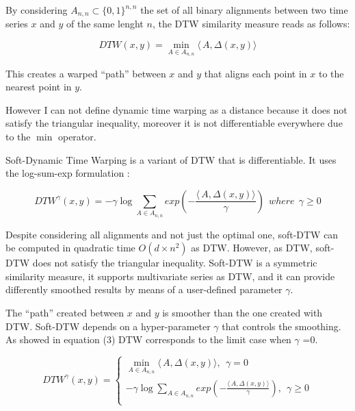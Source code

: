 \documentclass[11pt]{article}
\begin{document}
By considering \(A_{n,n} \subset \{0, 1\}^{n,n}\) the set of all binary
alignments between two time series \(x\) and \(y\) of the same lenght
\(n\), the DTW similarity measure reads as follows:

\begin{equation}
\label{eq:1}
DTW(x,y)= \min_{A \in A_{n,n} } \langle\,A,\Delta(x,y) \rangle
\end{equation}

This creates a warped ``path'' between \(x\) and \(y\) that aligns each
point in \(x\) to the nearest point in \(y\).

However I can not define dynamic time warping as a distance because it
does not satisfy the triangular inequality, moreover it is not
differentiable everywhere due to the \(\min\) operator.

Soft-Dynamic Time Warping is a variant of DTW that is differentiable. It
uses the log-sum-exp formulation \cite{cuturi2017soft}:

\begin{equation}
\label{eq:2}
DTW^{\gamma}(x,y)= - \gamma \log \sum_{A \in A_{n,n}} exp(- \frac{\langle\,A,\Delta(x,y) \rangle}{\gamma})
  \ \ where \ \ \gamma  \geq 0
\end{equation}

Despite considering all alignments and not just the optimal one,
soft-DTW can be computed in quadratic time \(O(d \times n^2)\) as DTW.
However, as DTW, soft-DTW does not satisfy the triangular inequality.
Soft-DTW is a symmetric similarity measure, it supports multivariate
series as DTW, and it can provide differently smoothed results by means
of a user-defined parameter \(\gamma\).

    The ``path'' created between \(x\) and \(y\) is smoother than the one
created with DTW. Soft-DTW depends on a hyper-parameter \(\gamma\) that
controls the smoothing. As showed in equation (3) DTW corresponds to the
limit case when \(\gamma\) =0.

\begin{equation}
\label{eq:3}
DTW^{\gamma}(x,y)=\begin{cases}
                     \min_{A \in A_{n,n} } \langle\,A,\Delta(x,y) \rangle ,\ \  \gamma=0 \\
                     - \gamma \log \sum_{A \in A_{n,n}} exp(- \frac{\langle\,A,\Delta(x,y) \rangle}{\gamma}), \ \ \gamma \geq 0 \\
                     \end{cases}
\end{equation}
\end{document}
